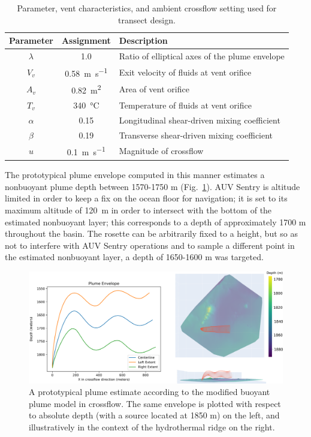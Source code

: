 \begin{table}[h!]
    \centering
    \begin{tabular}{c|c|l}
        Parameter & Assignment & Description \\
        \hline
        $\lambda$ & 1.0 & Ratio of elliptical axes of the plume envelope \\
        $V_v$ & \SI{0.58}{\meter\per\second} & Exit velocity of fluids at vent orifice \\
        $A_v$ & \SI{0.82}{\meter\squared} & Area of vent orifice \\
        $T_v$ & \SI{340}{\celsius} & Temperature of fluids at vent orifice \\
        $\alpha$ & 0.15 & Longitudinal shear-driven mixing coefficient \\
        $\beta$ & 0.19 & Transverse shear-driven mixing coefficient \\
        $u$ & \SI{0.1}{\meter\per\second} & Magnitude of crossflow \\
    \end{tabular}
    \caption{Parameter, vent characteristics, and ambient crossflow setting used for transect design.}
    \label{tab:params}
\end{table}

The prototypical plume envelope computed in this manner estimates a nonbuoyant plume depth between 1570-1750 m (Fig.~\ref{fig:plume_envelopes}). AUV Sentry is altitude limited in order to keep a fix on the ocean floor for navigation; it is set to its maximum altitude of \SI{120}{\meter} in order to intersect with the bottom of the estimated nonbuoyant layer; this corresponds to a depth of approximately 1700 m throughout the basin. The rosette can be arbitrarily fixed to a height, but so as not to interfere with AUV Sentry operations and to sample a different point in the estimated nonbuoyant layer, a depth of 1650-1600 m was targeted.

\begin{figure}[h!]
    \centering
    \includegraphics[width=1\columnwidth]{figures/plume_envelopes.png}
    \caption[Plume model for transect design]{A prototypical plume estimate according to the modified buoyant plume model in crossflow. The same envelope is plotted with respect to absolute depth (with a source located at 1850 m) on the left, and illustratively in the context of the hydrothermal ridge on the right.}
    \label{fig:plume_envelopes}
\end{figure}

